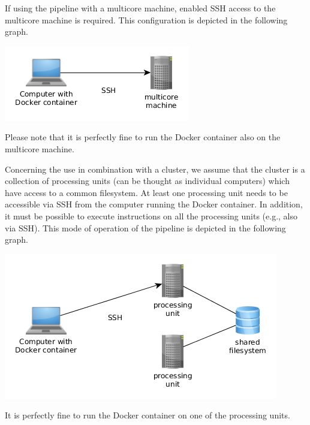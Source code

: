 \documentclass[12pt,a4paper]{scrartcl}
\begin{document}
 If using the pipeline with a multicore machine, enabled SSH access to the multicore machine is required.
 This configuration is depicted in the following graph.
 \begin{center}
 \includegraphics[scale=0.6]{graphs/multicore_config.png}
 \end{center}
 Please note that it is perfectly fine to run the Docker container also on the multicore machine.
 
 Concerning the use in combination with a cluster, we assume that the cluster is a collection of processing units (can be thought as individual computers) which have access to a common filesystem.
 At least one processing unit needs to be accessible via SSH from the computer running the Docker container.
 In addition, it must be possible to execute instructions on all the processing units (e.g., also via SSH). 
 This mode of operation of the pipeline is depicted in the following graph.
 \begin{center}
 \includegraphics[scale=0.6]{graphs/cluster_config.png}
 \end{center}
 It is perfectly fine to run the Docker container on one of the processing units.
 
\end{document}
